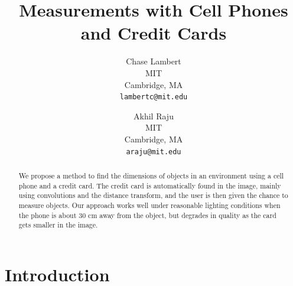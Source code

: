 \documentclass[10pt,twocolumn,letterpaper]{article}
\begin{document}
\title{Measurements with Cell Phones and Credit Cards}

\author{Chase Lambert\\
MIT\\
Cambridge, MA\\
{\tt\small lambertc@mit.edu}
\and
Akhil Raju\\
MIT\\
Cambridge, MA\\
{\tt\small araju@mit.edu}
}

\maketitle

\begin{abstract}
We propose a method to find the dimensions of objects in an environment using a cell phone and a credit card. The credit card is automatically found in the image, mainly using convolutions and the distance transform, and the user is then given the chance to measure objects. Our approach works well under reasonable lighting conditions when the phone is about 30 cm away from the object, but degrades in quality as the card gets smaller in the image.
\end{abstract}

\section{Introduction}
\end{document}
